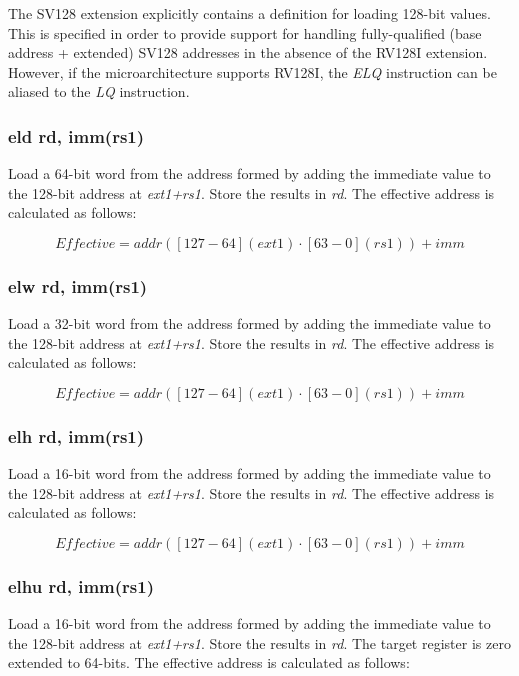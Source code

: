 \documentclass{article}
\begin{document}
\begin{commentary}
The SV128 extension explicitly contains a definition for loading 128-bit values.  
This is specified in order to provide support for handling fully-qualified (base 
address + extended) SV128 addresses in the absence of the RV128I extension.  However, 
if the microarchitecture supports RV128I, the \textit{ELQ} instruction can be aliased 
to the \textit{LQ} instruction.
\end{commentary}


\subsubsection{eld rd, imm(rs1)}
Load a 64-bit word from the address formed by adding the immediate value to the 
128-bit address at \textit{ext1+rs1}.  Store the results in \textit{rd}.  The effective 
address is calculated as follows: 

\begin{equation}
Effective = addr([127-64](ext1) \cdot [63-0](rs1))+imm
\end{equation}

\subsubsection{elw rd, imm(rs1)}
Load a 32-bit word from the address formed by adding the immediate value to the 
128-bit address at \textit{ext1+rs1}.  Store the results in \textit{rd}.  The effective 
address is calculated as follows: 

\begin{equation}
Effective = addr([127-64](ext1) \cdot [63-0](rs1))+imm
\end{equation}

\subsubsection{elh rd, imm(rs1)}
Load a 16-bit word from the address formed by adding the immediate value to the 
128-bit address at \textit{ext1+rs1}.  Store the results in \textit{rd}.  The effective 
address is calculated as follows: 

\begin{equation}
Effective = addr([127-64](ext1) \cdot [63-0](rs1))+imm
\end{equation}

\subsubsection{elhu rd, imm(rs1)}
Load a 16-bit word from the address formed by adding the immediate value to the 
128-bit address at \textit{ext1+rs1}.  Store the results in \textit{rd}.  
 The target register is zero extended to 64-bits.  The effective 
address is calculated as follows: 
\end{document}
